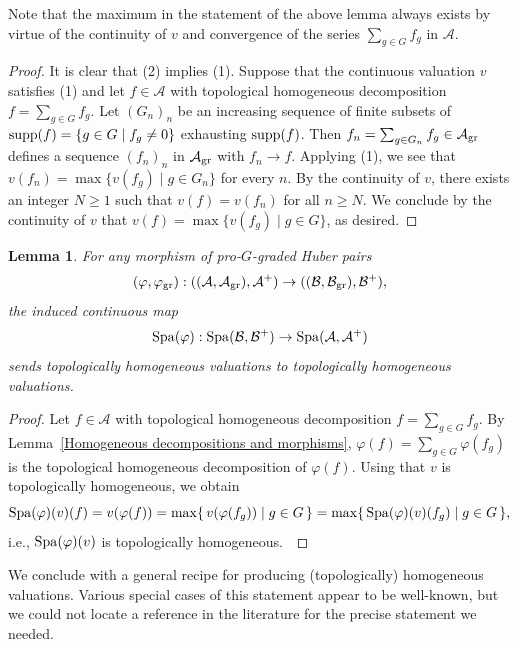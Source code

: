 \documentclass[12pt,twoside,a4paper]{article}
\newtheorem{lemma}[thm]{Lemma}
\theoremstyle{definition}
\theoremstyle{remark}
\newcommand\gr{{\rm gr}}
\newcommand\Spa{{\rm Spa}}
\newcommand\supp{{\rm supp}}
\begin{document}
Note that the maximum in the statement of the above lemma always exists by virtue of the continuity of $v$ and convergence of the series $\sum_{g\in G}f_{g}$ in $\mathcal{A}$.
\begin{proof}It is clear that (2) implies (1). Suppose that the continuous valuation $v$ satisfies (1) and let $f\in \mathcal{A}$ with topological homogeneous decomposition $f=\sum_{g\in G}f_{g}$. Let $(G_{n})_{n}$ be an increasing sequence of finite subsets of $\supp(f)=\{g\in G\mid f_{g}\neq0\}$ exhausting $\supp(f)$. Then $f_{n}=\sum_{g\in G_{n}}f_{g}\in \mathcal{A}_{\gr}$ defines a sequence $(f_{n})_{n}$ in $\mathcal{A}_{\gr}$ with $f_{n}\to f$. Applying (1), we see that $v(f_{n})=\max\{v(f_{g})\mid g\in G_{n}\}$ for every $n$. By the continuity of $v$, there exists an integer $N\geq1$ such that $v(f)=v(f_{n})$ for all $n\geq N$. We conclude by the continuity of $v$ that $v(f)=\max\{v(f_{g})\mid g\in G\}$, as desired. \end{proof}
\begin{lemma}\label{Topologically homogeneous valuations and morphisms}For any morphism of pro-$G$-graded Huber pairs \begin{equation*}(\varphi, \varphi_{\gr}): ((\mathcal{A}, \mathcal{A}_{\gr}), \mathcal{A}^{+})\to ((\mathcal{B}, \mathcal{B}_{\gr}), \mathcal{B}^{+}),\end{equation*}the induced continuous map \begin{equation*}\Spa(\varphi): \Spa(\mathcal{B}, \mathcal{B}^{+})\to \Spa(\mathcal{A}, \mathcal{A}^{+})\end{equation*}sends topologically homogeneous valuations to topologically homogeneous valuations.\end{lemma}
\begin{proof}Let $f\in \mathcal{A}$ with topological homogeneous decomposition $f=\sum_{g\in G}f_{g}$. By Lemma~\ref{Homogeneous decompositions and morphisms}, $\varphi(f)=\sum_{g\in G}\varphi(f_{g})$ is the topological homogeneous decomposition of $\varphi(f)$. Using that $v$ is topologically homogeneous, we obtain \begin{equation*}\Spa(\varphi)(v)(f)=v(\varphi(f))=\max\{\, v(\varphi(f_{g}))\mid g\in G\,\}=\max\{\, \Spa(\varphi)(v)(f_{g})\mid g\in G\,\},\end{equation*}i.e., $\Spa(\varphi)(v)$ is topologically homogeneous. \end{proof}
We conclude with a general recipe for producing (topologically) homogeneous valuations. Various special cases of this statement appear to be well-known, but we could not locate a reference in the literature for the precise statement we needed.  
\end{document}
